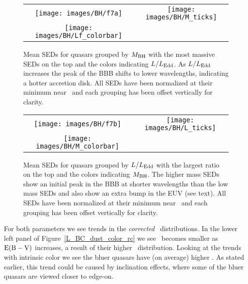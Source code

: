 \begin{figure}[t]
\begin{center}
\begin{tabular}{cc}
	\texttt{[image: images/BH/f7a]} & \texttt{[image: images/BH/M\_ticks]}\\
	\hspace{.4cm} \texttt{[image: images/BH/Lf\_colorbar]} &
\end{tabular}
\caption[Mean SEDs grouped by $\mbh$]{\label{Lfrac_sed} Mean SEDs for quasars grouped by $\mbh$ with the most massive SEDs on the top and the colors indicating $\lf$. As $\lf$ increases the peak of the BBB shifts to lower wavelengths, indicating a hotter accretion disk.  All SEDs have been normalized at their minimum near \onemum\ and each grouping has been offset vertically for clarity.}
\end{center}
\end{figure}

\begin{figure}[t]
\begin{center}
\begin{tabular}{cc}
	\texttt{[image: images/BH/f7b]} & \texttt{[image: images/BH/L\_ticks]}\\
	\hspace{.4cm} \texttt{[image: images/BH/M\_colorbar]} &
\end{tabular}
\caption[Mean SEDs grouped by $\lf$]{\label{Mbh_sed} Mean SEDs for quasars grouped by $\lf$ with the largest ratio on the top and the colors indicating $\mbh$. The higher mass SEDs show an initial peak in the BBB at shorter wavelengths than the low mass SEDs and also show an extra bump in the EUV (see text).  All SEDs have been normalized at their minimum near \onemum\ and each grouping has been offset vertically for clarity.}
\end{center}
\end{figure}

For both parameters we see trends in the {\em corrected} \bctwofive\ distributions.  In the lower left panel of Figure~\ref{L_BC_dust_color_rc} we see \bctwofive\ becomes smaller as ${\rm E(B-V)}$ increases, a result of their higher \ltwofive\ distribution. Looking at the trends with intrinsic color we see the bluer quasars have (on average) higher \bctwofive.  As stated earlier, this trend could be caused by inclination effects, where some of the bluer quasars are viewed closer to edge-on.


